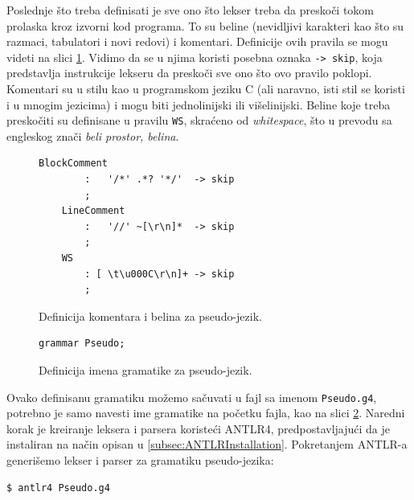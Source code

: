 Poslednje što treba definisati je sve ono što lekser treba da preskoči tokom prolaska kroz izvorni kod programa. To su beline (nevidljivi karakteri kao što su razmaci, tabulatori i novi redovi) i komentari. Definicije ovih pravila se mogu videti na slici \ref{fig:PseudoDef8}. Vidimo da se u njima koristi posebna oznaka \texttt{-> skip}, koja predstavlja instrukcije lekseru da preskoči sve ono što ovo pravilo poklopi. Komentari su u stilu kao u programskom jeziku C (ali naravno, isti stil se koristi i u mnogim jezicima) i mogu biti jednolinijski ili višelinijski. Beline koje treba preskočiti su definisane u pravilu \texttt{WS}, skraćeno od \emph{whitespace}, što u prevodu sa engleskog znači \emph{beli prostor, belina}.

\begin{figure}[h!]
    \begin{lstlisting}[language={}]
    BlockComment
        :   '/*' .*? '*/'  -> skip
        ;
    LineComment
        :   '//' ~[\r\n]*  -> skip
        ;
    WS  
        : [ \t\u000C\r\n]+ -> skip
        ;
    \end{lstlisting}
    \caption{Definicija komentara i belina za pseudo-jezik.}
    \label{fig:PseudoDef8}
\end{figure}

\begin{figure}[h!]
    \begin{lstlisting}[language={}]
    grammar Pseudo;
    \end{lstlisting}
    \caption{Definicija imena gramatike za pseudo-jezik.}
    \label{fig:PseudoDef9}
\end{figure}

Ovako definisanu gramatiku možemo sačuvati u fajl sa imenom \texttt{Pseudo.g4}, potrebno je samo navesti ime gramatike na početku fajla, kao na slici \ref{fig:PseudoDef9}. Naredni korak je kreiranje leksera i parsera koristeći ANTLR4, predpostavljajući da je instaliran na način opisan u \ref{subsec:ANTLRInstallation}. Pokretanjem ANTLR-a generišemo lekser i parser za gramatiku pseudo-jezika:
\begin{lstlisting}[language={}]
$ antlr4 Pseudo.g4
\end{lstlisting}

